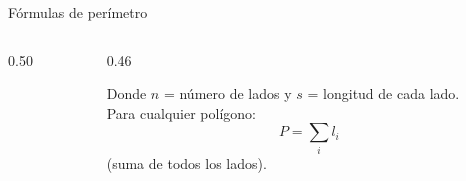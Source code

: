 \documentclass[aspectratio=169, 10pt, spanish]{beamer}
\begin{document}
\begin{frame}{Fórmulas de perímetro}
  \begin{columns}[t]
    \begin{column}{0.50\textwidth}
      \vspace{0.1cm}
      \vspace{0.1cm}
    \end{column}
    \begin{column}{0.46\textwidth}
      \vspace{0.1cm}
      \begin{teoriabox}
        \AlmFontSmall
        Donde $n$ = número de lados y $s$ = longitud de cada lado.\\[6pt]
        Para cualquier polígono:
        \[P = \sum_i l_i\]
        (suma de todos los lados).
      \end{teoriabox}
    \end{column}
  \end{columns}
\end{frame}
\end{document}
